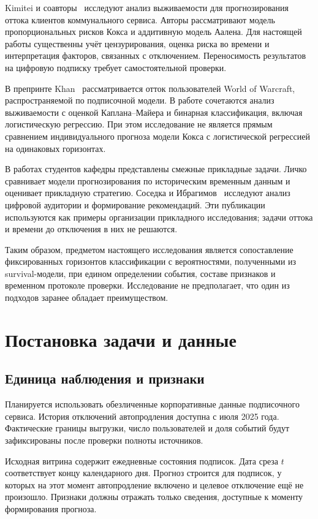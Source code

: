 \documentclass{misisarticle}
\begin{document}
Kimitei и соавторы~\cite{kimitei2025} исследуют анализ выживаемости для прогнозирования оттока клиентов коммунального сервиса. Авторы рассматривают модель пропорциональных рисков Кокса и аддитивную модель Аалена. Для настоящей работы существенны учёт цензурирования, оценка риска во времени и интерпретация факторов, связанных с отключением. Переносимость результатов на цифровую подписку требует самостоятельной проверки.

В препринте Khan~\cite{khan2020} рассматривается отток пользователей World of Warcraft, распространяемой по подписочной модели. В работе сочетаются анализ выживаемости с оценкой Каплана--Майера и бинарная классификация, включая логистическую регрессию. При этом исследование не является прямым сравнением индивидуального прогноза модели Кокса с логистической регрессией на одинаковых горизонтах.

В работах студентов кафедры представлены смежные прикладные задачи. Личко~\cite{lichko2023} сравнивает модели прогнозирования по историческим временным данным и оценивает прикладную стратегию. Соседка и Ибрагимов~\cite{sosedka2024} исследуют анализ цифровой аудитории и формирование рекомендаций. Эти публикации используются как примеры организации прикладного исследования; задачи оттока и времени до отключения в них не решаются.

Таким образом, предметом настоящего исследования является сопоставление фиксированных горизонтов классификации с вероятностями, полученными из survival-модели, при едином определении события, составе признаков и временном протоколе проверки. Исследование не предполагает, что один из подходов заранее обладает преимуществом.

\section{Постановка задачи и данные}

\subsection{Единица наблюдения и признаки}

Планируется использовать обезличенные корпоративные данные подписочного сервиса. История отключений автопродления доступна с июля 2025 года. Фактические границы выгрузки, число пользователей и доля событий будут зафиксированы после проверки полноты источников.

Исходная витрина содержит ежедневные состояния подписок. Дата среза $t$ соответствует концу календарного дня. Прогноз строится для подписок, у которых на этот момент автопродление включено и целевое отключение ещё не произошло. Признаки должны отражать только сведения, доступные к моменту формирования прогноза.
\end{document}
